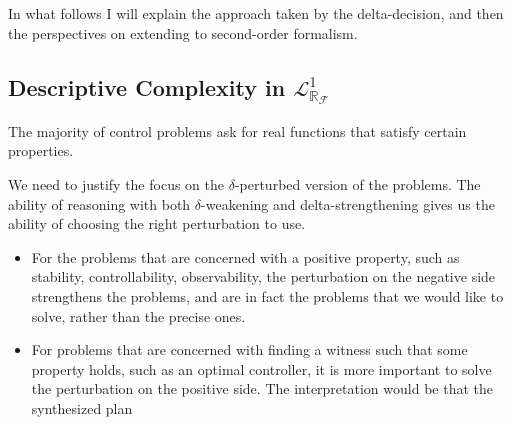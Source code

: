 \documentclass[10pt]{article}
\newcommand{\lrf}{\mathcal{L}_{\mathbb{R}_{\mathcal{F}}}}
\theoremstyle{definition}
\begin{document}
In what follows I will explain the approach taken by the delta-decision, and then the perspectives on extending to second-order formalism. 

\subsection{Descriptive Complexity in $\lrf^1$} 

The majority of control problems ask for real functions that satisfy certain properties. 

We need to justify the focus on the $\delta$-perturbed version of the problems. The ability of reasoning with both $\delta$-weakening and delta-strengthening gives us the ability of choosing the right perturbation to use. 
\begin{itemize}
\item For the problems that are concerned with a positive property, such as stability, controllability, observability, the perturbation on the negative side strengthens the problems, and are in fact the problems that we would like to solve, rather than the precise ones. 
\item For problems that are concerned with finding a witness such that some property holds, such as an optimal controller, it is more important to solve the perturbation on the positive side. The interpretation would be that the synthesized plan 
\end{itemize}
\end{document}
